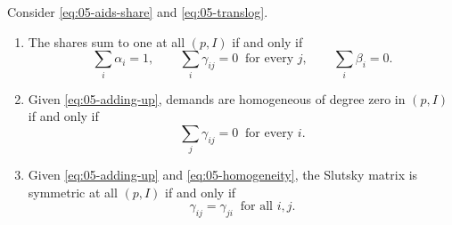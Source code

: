 \begin{proposition}\label{prop:05-restrictions}
Consider \eqref{eq:05-aids-share} and \eqref{eq:05-translog}.
\begin{enumerate}[label=(\roman*)]
\item The shares sum to one at all $(p, I)$ if and only if
  \begin{equation}\label{eq:05-adding-up}
  \sum_i\alpha_i = 1, \qquad \sum_i\gamma_{ij} = 0 \ \text{ for every } j, \qquad \sum_i\beta_i = 0 .
  \end{equation}
\item Given \eqref{eq:05-adding-up}, demands are homogeneous of degree zero in $(p, I)$ if and only if
  \begin{equation}\label{eq:05-homogeneity}
  \sum_j\gamma_{ij} = 0 \ \text{ for every } i .
  \end{equation}
\item Given \eqref{eq:05-adding-up} and \eqref{eq:05-homogeneity}, the Slutsky matrix is symmetric at all
  $(p, I)$ if and only if
  \begin{equation}\label{eq:05-symmetry}
  \gamma_{ij} = \gamma_{ji} \ \text{ for all } i, j .
  \end{equation}
\end{enumerate}
\end{proposition}


